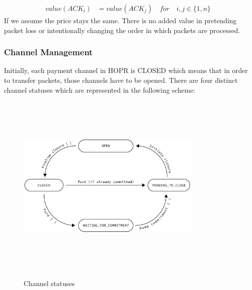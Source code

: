 \begin{align}
 value ( ACK_i )  &  =value ( ACK_j ) \quad for \quad i,j\in \{1,n\}
\end{align}
If we assume the price stays the same. There is no added value in pretending packet loss or intentionally changing the order in which packets are processed.

\subsubsection{Channel Management}
Initially, each payment channel in HOPR is CLOSED which means that in order to transfer packets, those channels have to be opened. There are four distinct channel statuses which are represented in the following scheme:

\begin{figure}[H]
    \centering
    \includegraphics[width=9cm,height=9cm,keepaspectratio]{../yellowpaper/images/states1.png}
\label{fig:channel statuses}
    \caption{Channel statuses}
\end{figure}

